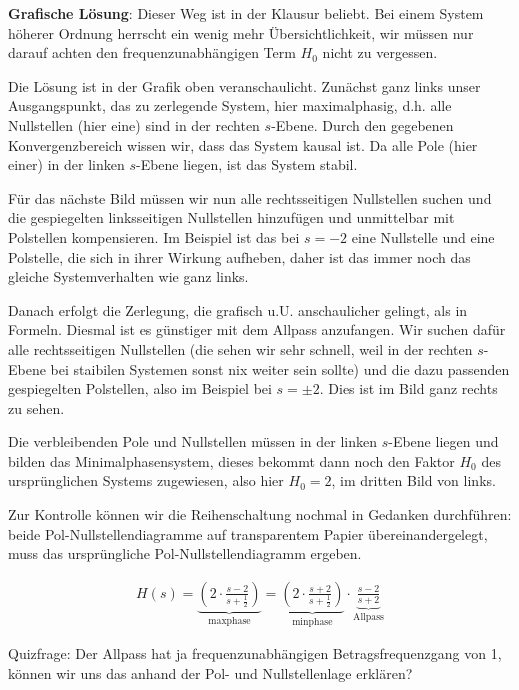 \begin{ExCalc}
\textbf{Grafische Lösung}: Dieser Weg ist in der Klausur beliebt.
Bei einem System höherer Ordnung herrscht ein wenig mehr Übersichtlichkeit,
wir müssen nur darauf achten den frequenzunabhängigen Term $H_0$ nicht zu vergessen.

Die Lösung ist in der Grafik oben veranschaulicht. Zunächst ganz links unser
Ausgangspunkt, das zu zerlegende System, hier maximalphasig, d.h.
alle Nullstellen (hier eine) sind in der rechten $s$-Ebene.
Durch den gegebenen Konvergenzbereich wissen wir, dass das System kausal ist.
Da alle Pole (hier einer) in der linken $s$-Ebene liegen, ist das System
stabil.

Für das nächste Bild müssen wir nun alle rechtsseitigen Nullstellen
suchen und die gespiegelten linksseitigen Nullstellen hinzufügen und unmittelbar
mit Polstellen kompensieren.
Im Beispiel ist das bei $s=-2$ eine Nullstelle und eine Polstelle,
die sich in ihrer Wirkung aufheben, daher ist das immer noch das gleiche
Systemverhalten wie ganz links.

Danach erfolgt die Zerlegung, die grafisch u.U. anschaulicher gelingt, als in Formeln.
Diesmal ist es günstiger mit dem Allpass anzufangen.
Wir suchen dafür alle rechtsseitigen Nullstellen (die sehen wir sehr schnell, weil
in der rechten $s$-Ebene bei staibilen Systemen sonst nix weiter sein sollte)
und die dazu passenden gespiegelten Polstellen, also im Beispiel bei $s=\pm 2$.
Dies ist im Bild ganz rechts zu sehen.

Die verbleibenden Pole und Nullstellen müssen in der linken $s$-Ebene liegen und
bilden das Minimalphasensystem, dieses bekommt dann noch den Faktor $H_0$ des
ursprünglichen Systems zugewiesen, also hier $H_0=2$, im dritten Bild von links.

Zur Kontrolle können wir die Reihenschaltung nochmal in Gedanken durchführen:
beide Pol-Nullstellendiagramme auf transparentem Papier übereinandergelegt,
muss das ursprüngliche Pol-Nullstellendiagramm ergeben.

\end{ExCalc}


\begin{Loesung}
\begin{align}
H(s) =
\underbrace{\left(2\cdot\frac{s-2}{s+\frac{1}{2}}\right)}_{\mathrm{max phase}} =
\underbrace{\left(2\cdot\frac{s+2}{s+\frac{1}{2}}\right)}_{\mathrm{min phase}}
\cdot \underbrace{\frac{s-2}{s+2}}_{\mathrm{Allpass}}
\end{align}

Quizfrage: Der Allpass hat ja frequenzunabhängigen Betragsfrequenzgang von 1,
können wir uns das anhand der Pol- und Nullstellenlage erklären?
\end{Loesung}






